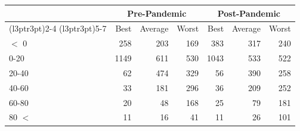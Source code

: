 
\begin{tabular}[t]{lrrrrrr}
\toprule
\multicolumn{1}{c}{ } & \multicolumn{3}{c}{Pre-Pandemic} & \multicolumn{3}{c}{Post-Pandemic} \\
\cmidrule(l{3pt}r{3pt}){2-4} \cmidrule(l{3pt}r{3pt}){5-7}
 & Best & Average & Worst & Best & Average & Worst\\
\midrule
$<$ 0 & 258 & 203 & 169 & 383 & 317 & 240\\
0-20 & 1149 & 611 & 530 & 1043 & 533 & 522\\
20-40 & 62 & 474 & 329 & 56 & 390 & 258\\
40-60 & 33 & 181 & 296 & 36 & 209 & 252\\
60-80 & 20 & 48 & 168 & 25 & 79 & 181\\
80 $<$ & 11 & 16 & 41 & 11 & 26 & 101\\
\bottomrule
\end{tabular}
